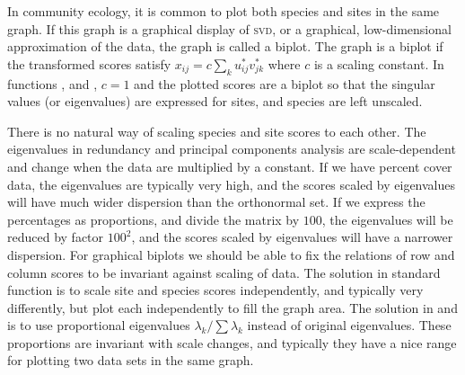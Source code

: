 \documentclass[article,nojss]{jss}
\begin{document}
In community ecology, it is common to plot both species and sites in
the same graph.  If this graph is a graphical display of \textsc{svd},
or a graphical, low-dimensional approximation of the data, the graph
is called a biplot.  The graph is a biplot if the transformed scores
satisfy $x_{ij} = c \sum_k u_{ij}^* v_{jk}^*$ where $c$ is a scaling
constant.  In functions ,  and
, $c=1$ and the plotted scores are a biplot so that the
singular values (or eigenvalues) are expressed for sites, and species
are left unscaled.  

There is no natural way of scaling species and site scores to each
other.  The eigenvalues in redundancy and principal components
analysis are scale-dependent and change when the  data are
multiplied by a constant.  If we have percent cover data, the
eigenvalues are typically very high, and the scores scaled by
eigenvalues will have much wider dispersion than the orthonormal set.
If we express the percentages as proportions, and divide the matrix by
$100$, the eigenvalues will be reduced by factor $100^2$, and the
scores scaled by eigenvalues will have a narrower dispersion.  For
graphical biplots we should be able to fix the relations of row and
column scores to be invariant against scaling of data.  The solution
in  standard function  is to scale site and species
scores independently, and typically very differently, but plot each
independently to fill the graph area.  The solution in  and 
 is to use proportional eigenvalues $\lambda_k / \sum
\lambda_k$ instead of original eigenvalues.  These proportions are
invariant with scale changes, and typically they have a nice range for
plotting two data sets in the same graph.
\end{document}
